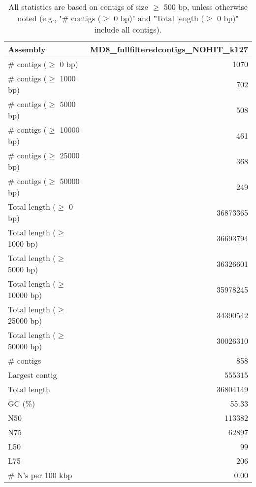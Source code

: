 \documentclass[12pt,a4paper]{article}
\begin{document}
\begin{table}[ht]
\begin{center}
\caption{All statistics are based on contigs of size $\geq$ 500 bp, unless otherwise noted (e.g., "\# contigs ($\geq$ 0 bp)" and "Total length ($\geq$ 0 bp)" include all contigs).}
\begin{tabular}{|l*{1}{|r}|}
\hline
Assembly & MD8\_fullfilteredcontigs\_NOHIT\_k127 \\ \hline
\# contigs ($\geq$ 0 bp) & 1070 \\ \hline
\# contigs ($\geq$ 1000 bp) & 702 \\ \hline
\# contigs ($\geq$ 5000 bp) & 508 \\ \hline
\# contigs ($\geq$ 10000 bp) & 461 \\ \hline
\# contigs ($\geq$ 25000 bp) & 368 \\ \hline
\# contigs ($\geq$ 50000 bp) & 249 \\ \hline
Total length ($\geq$ 0 bp) & 36873365 \\ \hline
Total length ($\geq$ 1000 bp) & 36693794 \\ \hline
Total length ($\geq$ 5000 bp) & 36326601 \\ \hline
Total length ($\geq$ 10000 bp) & 35978245 \\ \hline
Total length ($\geq$ 25000 bp) & 34390542 \\ \hline
Total length ($\geq$ 50000 bp) & 30026310 \\ \hline
\# contigs & 858 \\ \hline
Largest contig & 555315 \\ \hline
Total length & 36804149 \\ \hline
GC (\%) & 55.33 \\ \hline
N50 & 113382 \\ \hline
N75 & 62897 \\ \hline
L50 & 99 \\ \hline
L75 & 206 \\ \hline
\# N's per 100 kbp & 0.00 \\ \hline
\end{tabular}
\end{center}
\end{table}
\end{document}
